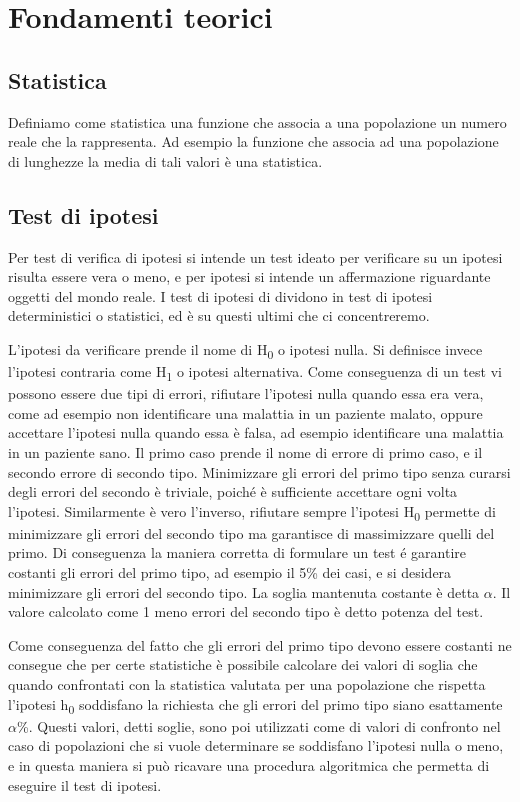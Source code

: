 \section{Fondamenti teorici}


\subsection{Statistica}
Definiamo come statistica una funzione che associa a una popolazione un numero reale che la rappresenta. Ad esempio la funzione che associa ad una popolazione di lunghezze la media di tali valori è una statistica.
 

\subsection{Test di ipotesi}
Per test di verifica di ipotesi si intende un test ideato per verificare su un ipotesi risulta essere vera o meno, e per ipotesi si intende un affermazione riguardante oggetti del mondo reale. I test di ipotesi di dividono in test di ipotesi deterministici o statistici, ed è su questi ultimi che ci concentreremo.

L'ipotesi da verificare prende il nome di H\textsubscript{0} o ipotesi nulla. Si definisce invece l'ipotesi contraria come H\textsubscript{1} o ipotesi alternativa.
Come conseguenza di un test vi possono essere due tipi di errori, rifiutare l'ipotesi nulla quando essa era vera, come ad esempio non identificare una malattia in un paziente malato, oppure accettare l'ipotesi nulla quando essa è falsa, ad esempio identificare una malattia in un paziente sano. Il primo caso prende il nome di errore di primo caso, e il secondo errore di secondo tipo.
Minimizzare gli errori del primo tipo senza curarsi degli errori del secondo è triviale, poiché è sufficiente accettare ogni volta l'ipotesi. Similarmente è vero l'inverso, rifiutare sempre l'ipotesi H\textsubscript{0} permette di minimizzare gli errori del secondo tipo ma garantisce di massimizzare quelli del primo.
Di conseguenza la maniera corretta di formulare un test é garantire costanti gli errori del primo tipo, ad esempio il 5\% dei casi, e si desidera minimizzare gli errori del secondo tipo. La soglia mantenuta costante è detta $\alpha$.
Il valore calcolato come 1 meno errori del secondo tipo è detto potenza del test.

Come conseguenza del fatto che gli errori del primo tipo devono essere costanti ne consegue che per certe statistiche è possibile calcolare dei valori di soglia che quando confrontati con la statistica valutata per una popolazione che rispetta l'ipotesi h\textsubscript{0} soddisfano la richiesta che gli errori del primo tipo siano esattamente $\alpha$\%.
Questi valori, detti soglie, sono poi utilizzati come di valori di confronto nel caso di popolazioni che si vuole determinare se soddisfano l'ipotesi nulla o meno, e in questa maniera si può ricavare una procedura algoritmica che permetta di eseguire il test di ipotesi.

